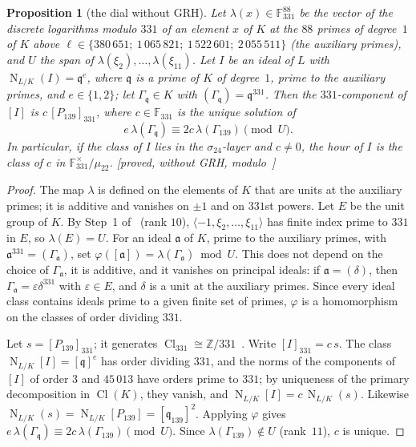 \documentclass[11pt,a4paper]{amsart}
\theoremstyle{plain}
\newtheorem{proposition}{Proposition}[section]
\theoremstyle{definition}
\newcommand{\Z}{\mathbb{Z}}
\newcommand{\F}{\mathbb{F}}
\newcommand{\q}{\mathfrak{q}}
\DeclareMathOperator{\Nm}{N}
\DeclareMathOperator{\Cl}{Cl}
\newcommand{\st}[1]{\textup{\textsf{\small[#1]}}}
\begin{document}
\begin{proposition}[the dial without GRH]\label{prop:dial}
Let $\lambda(x)\in\F_{331}^{88}$ be the vector of the discrete logarithms modulo $331$ of an element $x$ of $K$ at the $88$ primes of degree~$1$ of $K$ above $\ell\in\{380\,651;\ 1\,065\,821;\ 1\,522\,601;\ 2\,055\,511\}$ (the auxiliary primes), and $U$ the span of $\lambda(\xi_2),\dots,\lambda(\xi_{11})$. Let $I$ be an ideal of $L$ with $\Nm_{L/K}(I)=\q^e$, where $\q$ is a prime of $K$ of degree~$1$, prime to the auxiliary primes, and $e\in\{1,2\}$; let $\Gamma_\q\in K$ with $(\Gamma_\q)=\q^{331}$. Then the $331$-component of $[I]$ is $c\,[P_{139}]_{331}$, where $c\in\F_{331}$ is the unique solution of
\[
e\,\lambda(\Gamma_\q)\equiv2c\,\lambda(\Gamma_{139})\pmod U .
\]
In particular, if the class of $I$ lies in the $\sigma_{24}$-layer and $c\ne0$, the hour of $I$ is the class of $c$ in $\F_{331}^\times/\mu_{22}$. \st{proved, without GRH, modulo~\cite[Prop.~2.2, 2.5]{Gau26}}
\end{proposition}

\begin{proof}
The map $\lambda$ is defined on the elements of $K$ that are units at the auxiliary primes; it is additive and vanishes on $\pm1$ and on $331$st powers. Let $E$ be the unit group of $K$. By Step~1 of~\cite[\S6.4]{Gau26} (rank $10$), $\langle-1,\xi_2,\dots,\xi_{11}\rangle$ has finite index prime to $331$ in $E$, so $\lambda(E)=U$. For an ideal $\mathfrak a$ of $K$, prime to the auxiliary primes, with $\mathfrak a^{331}=(\Gamma_{\mathfrak a})$, set $\varphi([\mathfrak a])=\lambda(\Gamma_{\mathfrak a})\bmod U$. This does not depend on the choice of $\Gamma_{\mathfrak a}$, it is additive, and it vanishes on principal ideals: if $\mathfrak a=(\delta)$, then $\Gamma_{\mathfrak a}=\varepsilon\delta^{331}$ with $\varepsilon\in E$, and $\delta$ is a unit at the auxiliary primes. Since every ideal class contains ideals prime to a given finite set of primes, $\varphi$ is a homomorphism on the classes of order dividing $331$.

Let $s=[P_{139}]_{331}$; it generates $\Cl_{331}\cong\Z/331$~\cite[Rem.~6.8(a)]{Gau26}. Write $[I]_{331}=c\,s$. The class $\Nm_{L/K}[I]=[\q]^e$ has order dividing $331$, and the norms of the components of $[I]$ of order $3$ and $45\,013$ have orders prime to $331$; by uniqueness of the primary decomposition in $\Cl(K)$, they vanish, and $\Nm_{L/K}[I]=c\,\Nm_{L/K}(s)$. Likewise $\Nm_{L/K}(s)=\Nm_{L/K}[P_{139}]=[\q_{139}]^2$. Applying $\varphi$ gives $e\,\lambda(\Gamma_\q)\equiv2c\,\lambda(\Gamma_{139})\pmod U$. Since $\lambda(\Gamma_{139})\notin U$ (rank~$11$), $c$ is unique.
\end{proof}
\end{document}
